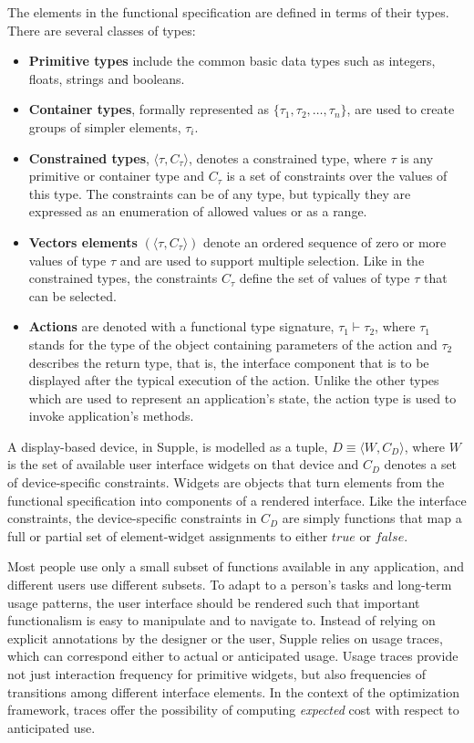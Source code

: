 The elements in the functional specification are defined in terms of their types. There are several classes of types:
\begin{itemize}
\item \textbf{Primitive types} include the common basic data types such as integers, floats, strings and booleans.

\item \textbf{Container types}, formally represented as $\lbrace \tau_{1}, \tau_{2}, …, \tau_{n} \rbrace$, are used to create groups of simpler elements, $\tau_{i}$.

\item \textbf{Constrained types}, $ \langle \tau, C_{\tau} \rangle $, denotes a constrained type, where $\tau$ is any primitive or container type and $C_{\tau}$ is a set of constraints over the values of this type. The constraints can be of any type, but typically they are expressed as an enumeration of allowed values or as a range.

\item \textbf{Vectors elements}  $ ( \langle \tau, C_{\tau} \rangle ) $ denote an ordered sequence of zero or more values of type $\tau$ and are used to support multiple selection. Like in the constrained types, the constraints $C_{\tau}$ define the set of values of type $\tau$ that can be selected.

\item \textbf{Actions} are denoted with a functional type signature, $\tau_{1} \vdash \tau_{2}$, where $\tau_{1}$ stands for the type of the object containing parameters of the action and $\tau_{2}$ describes the return type, that is, the interface component that is to be displayed after the typical execution of the action. Unlike the other types which are used to represent an application's state, the action type is used to invoke application's methods.
\end{itemize}

A display-based device, in Supple, is modelled as a tuple, $D \equiv \langle W, C_{D} \rangle $, where $W$ is the set of available user interface widgets on that device and $C_{D}$ denotes a set of device-specific constraints. Widgets are objects that turn elements from the functional specification into components of a rendered interface. Like the interface constraints, the device-specific constraints in $C_{D}$ are simply functions that map a full or partial set of element-widget assignments to either $true$ or $false$.

Most people use only a small subset of functions available in any application, and different users use different subsets. To adapt to a person's tasks and long-term usage patterns, the user interface should be rendered such that important functionalism is easy to manipulate and to navigate to. Instead of relying on explicit annotations by the designer or the user, Supple relies on usage traces, which can correspond either to actual or anticipated usage. Usage traces provide not just interaction frequency for primitive widgets, but also frequencies of transitions among different interface elements. In the context of the optimization framework, traces offer the possibility of computing \textit{expected} cost with respect to anticipated use.


